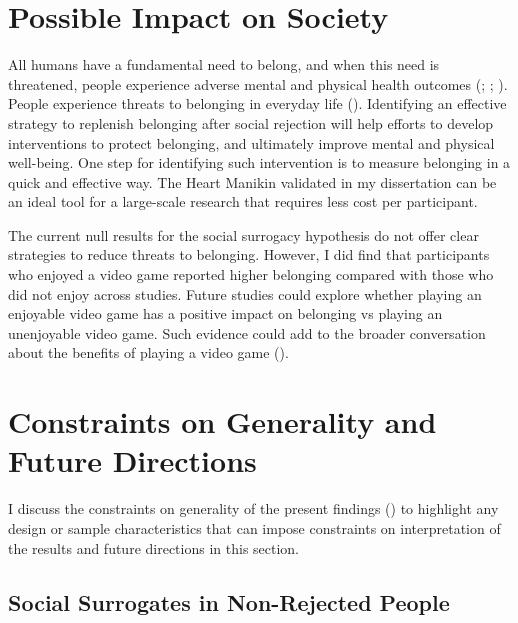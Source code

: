 \documentclass[
]{udthesis}
\begin{document}
\section{Possible Impact on Society}\label{possible-impact-on-society}

All humans have a fundamental need to belong, and when this need is
threatened, people experience adverse mental and physical health
outcomes (; ; ). People experience
threats to belonging in everyday life (). Identifying an
effective strategy to replenish belonging after social rejection will
help efforts to develop interventions to protect belonging, and
ultimately improve mental and physical well-being. One step for
identifying such intervention is to measure belonging in a quick and
effective way. The Heart Manikin validated in my dissertation can be an
ideal tool for a large-scale research that requires less cost per
participant.

The current null results for the social surrogacy hypothesis do not
offer clear strategies to reduce threats to belonging. However, I did
find that participants who enjoyed a video game reported higher
belonging compared with those who did not enjoy across studies. Future
studies could explore whether playing an enjoyable video game has a
positive impact on belonging vs playing an unenjoyable video game. Such
evidence could add to the broader conversation about the benefits of
playing a video game ().

\section{Constraints on Generality and Future Directions}\label{constraints-on-generality-and-future-directions}

I discuss the constraints on generality of the present findings
() to highlight any design or sample characteristics that can
impose constraints on interpretation of the results and future
directions in this section.

\subsection{Social Surrogates in Non-Rejected People}\label{social-surrogates-in-non-rejected-people}
\end{document}
